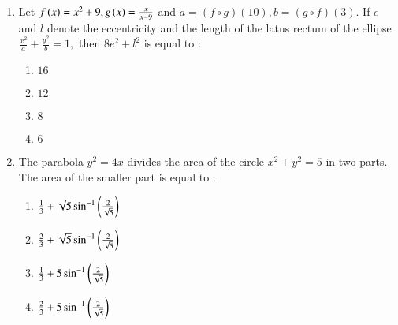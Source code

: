\documentclass[journal,12pt,onecolumn]{IEEEtran}
\theoremstyle{remark}
\begin{document}
\begin{enumerate}
    \item Let $f\left(x\right)=x^2+9, g\left(x\right)= \frac{x}{x-9}$ and $a=(f \circ g)(10), b= (g \circ f)(3).$ If $e$ and $l$ denote the eccentricity and the length of the latus rectum of the ellipse $\frac{x^2}{a} + \frac{y^2}{b} = 1,$ then $8e^2 + l^2$ is equal to :
    \begin{enumerate}
        \item $16$
        \item $12$
        \item $8$
        \item $6$ \\
    \end{enumerate}


    \item The parabola $y^2=4x$ divides the area of the circle $x^2+y^2=5$ in two parts. The area of the smaller part is equal to :
    \begin{enumerate}
        \item $\frac{1}{3} + \sqrt{5} \sin^{-1} \left(\frac{2}{\sqrt{5}}\right)$
        \item $\frac{2}{3} + \sqrt{5} \sin^{-1} \left(\frac{2}{\sqrt{5}}\right)$
        \item $\frac{1}{3} + 5 \sin^{-1} \left(\frac{2}{\sqrt{5}}\right)$
        \item $\frac{2}{3} + 5 \sin^{-1} \left(\frac{2}{\sqrt{5}}\right)$\\
    \end{enumerate}
\end{enumerate}
\end{document}
